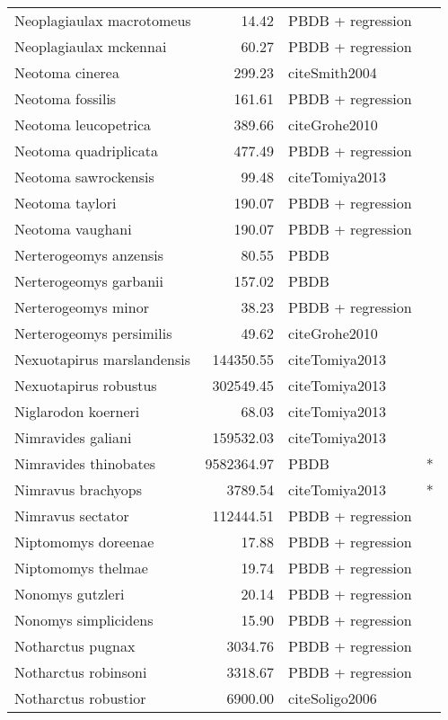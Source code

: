 \begin{table}[ht]
\begin{tabular}{lrll}
  Neoplagiaulax macrotomeus & 14.42 & PBDB + regression &  \\ 
  Neoplagiaulax mckennai & 60.27 & PBDB + regression &  \\ 
  Neotoma cinerea & 299.23 & cite{Smith2004} &  \\ 
  Neotoma fossilis & 161.61 & PBDB + regression &  \\ 
  Neotoma leucopetrica & 389.66 & cite{Grohe2010} &  \\ 
  Neotoma quadriplicata & 477.49 & PBDB + regression &  \\ 
  Neotoma sawrockensis & 99.48 & cite{Tomiya2013} &  \\ 
  Neotoma taylori & 190.07 & PBDB + regression &  \\ 
  Neotoma vaughani & 190.07 & PBDB + regression &  \\ 
  Nerterogeomys anzensis & 80.55 & PBDB &  \\ 
  Nerterogeomys garbanii & 157.02 & PBDB &  \\ 
  Nerterogeomys minor & 38.23 & PBDB + regression &  \\ 
  Nerterogeomys persimilis & 49.62 & cite{Grohe2010} &  \\ 
  Nexuotapirus marslandensis & 144350.55 & cite{Tomiya2013} &  \\ 
  Nexuotapirus robustus & 302549.45 & cite{Tomiya2013} &  \\ 
  Niglarodon koerneri & 68.03 & cite{Tomiya2013} &  \\ 
  Nimravides galiani & 159532.03 & cite{Tomiya2013} &  \\ 
  Nimravides thinobates & 9582364.97 & PBDB & * \\ 
  Nimravus brachyops & 3789.54 & cite{Tomiya2013} & * \\ 
  Nimravus sectator & 112444.51 & PBDB + regression &  \\ 
  Niptomomys doreenae & 17.88 & PBDB + regression &  \\ 
  Niptomomys thelmae & 19.74 & PBDB + regression &  \\ 
  Nonomys gutzleri & 20.14 & PBDB + regression &  \\ 
  Nonomys simplicidens & 15.90 & PBDB + regression &  \\ 
  Notharctus pugnax & 3034.76 & PBDB + regression &  \\ 
  Notharctus robinsoni & 3318.67 & PBDB + regression &  \\ 
  Notharctus robustior & 6900.00 & cite{Soligo2006} &  \\ 

\end{tabular}
\end{table}
